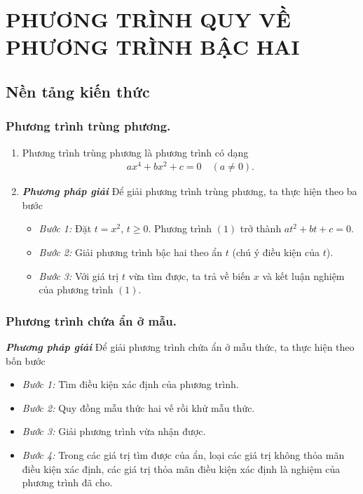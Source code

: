 

\section{PHƯƠNG TRÌNH QUY VỀ PHƯƠNG TRÌNH BẬC HAI}

\subsection{Nền tảng kiến thức}
\subsubsection{Phương trình trùng phương.}
\begin{enumerate}
	\item Phương trình trùng phương là phương trình có dạng 
	\begin{align}
	ax^4+bx^2+c=0 \quad(a\ne 0). \tag{1}
	\end{align}
	\item \textit{\textbf{Phương pháp giải}} Để giải phương trình trùng phương, ta thực hiện theo ba bước
	\begin{itemize}
		\item \textit{Bước 1:} Đặt $t=x^2$, $t\ge 0$. Phương trình $(1)$ trở thành $at^2+bt+c=0$.
		\item \textit{Bước 2:} Giải phương trình bậc hai theo ẩn $t$ (chú ý điều kiện của $t$).
		\item \textit{Bước 3:} Với giá trị $t$ vừa tìm được, ta trả về biến $x$ và kết luận nghiệm của phương trình $(1)$.		
	\end{itemize}
\end{enumerate}

\subsubsection{Phương trình chứa ẩn ở mẫu.}
\textbf{\textit{Phương pháp giải}} Để giải phương trình chứa ẩn ở mẫu thức, ta thực hiện theo bốn bước
\begin{itemize}
	\item \textit{Bước 1:} Tìm điều kiện xác định của phương trình.
	\item \textit{Bước 2:} Quy đồng mẫu thức hai vế rồi khử mẫu thức.
	\item \textit{Bước 3:} Giải phương trình vừa nhận được.
	\item \textit{Bước 4:} Trong các giá trị tìm được của ẩn, loại các giá trị không thỏa mãn điều kiện xác định, các giá trị thỏa mãn điều kiện xác định là nghiệm của phương trình đã cho.
\end{itemize}
